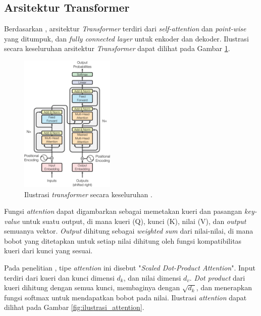     \subsection{Arsitektur Transformer}

    Berdasarkan \parencite{AttentionVaswani2017}, arsitektur \textit{Transformer} terdiri dari \textit{self-attention} dan \textit{point-wise} yang ditumpuk, dan \textit{fully connected layer} untuk enkoder dan dekoder. Ilustrasi secara keseluruhan arsitektur \textit{Transformer} dapat dilihat pada Gambar \ref{fig:ilustrasi_transformer}.

    \begin{figure}[ht]
        \centering
        \includegraphics[width=0.4\textwidth]{resources/overview-transformer.png}
        \caption{Ilustrasi \textit{transformer} secara keseluruhan \parencite{AttentionVaswani2017}.}
        \label{fig:ilustrasi_transformer}
    \end{figure}

    Fungsi \textit{attention} dapat digambarkan sebagai memetakan kueri dan pasangan \textit{key-value} untuk suatu output, di mana kueri (Q), kunci (K), nilai (V), dan \textit{output} semuanya vektor. \textit{Output} dihitung sebagai \textit{weighted sum} dari nilai-nilai, di mana bobot yang ditetapkan untuk setiap nilai dihitung oleh fungsi kompatibilitas kueri dari kunci yang sesuai.

    Pada penelitian \parencite{AttentionVaswani2017}, tipe \textit{attention} ini disebut "\textit{Scaled Dot-Product Attention}". Input terdiri dari kueri dan kunci dimensi \(d_{k}\), dan nilai dimensi \(d_{v}\). \textit{Dot product} dari kueri dihitung dengan semua kunci, membaginya dengan \(\sqrt{d_{k}}\), dan menerapkan fungsi softmax untuk mendapatkan bobot pada nilai. Ilustrasi \textit{attention} dapat dilihat pada Gambar \ref{fig:ilustrasi_attention}.

